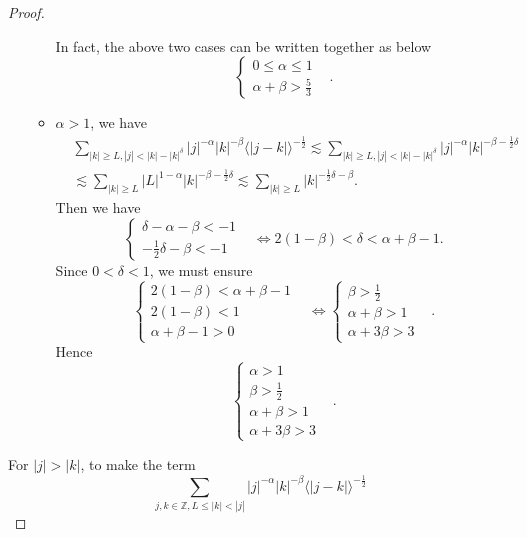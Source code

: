 \documentclass[12pt]{amsart}
\theoremstyle{definition}
\numberwithin{equation}{section}
\begin{document}
\begin{proof}
\begin{enumerate}
\begin{itemize}
     In fact, the above two cases can be written together as below 
     \begin{equation}
       \begin{cases}
          0\le \alpha\le 1&\\ 
          \alpha+\beta>\frac{5}{3}& 
       \end{cases}.       \label{case1}
     \end{equation}
       \item $\alpha>1$, we have  
    \begin{align*}
          & \sum_{|k|\ge L,|j|<|k|-|k|^\delta}|j|^{-\alpha}|k|^{-\beta}\langle |j-k|\rangle^{-\frac{1}{2}}\lesssim \sum_{|k|\ge L,|j|<|k|-|k|^{\delta}}|j|^{-\alpha}|k|^{-\beta-\frac{1}{2}\delta}\\
          &\lesssim \sum_{|k|\ge L }|L|^{1-\alpha}|k|^{-\beta-\frac{1}{2}\delta}\lesssim\sum_{|k|\ge L}|k|^{-\frac{1}{2}\delta-\beta}.
    \end{align*} 
    Then we have 
    $$
       \begin{cases}
          \delta-\alpha-\beta<-1 &\\
          -\frac{1}{2}\delta-\beta<-1 &
       \end{cases}\Leftrightarrow 2(1-\beta)<\delta<\alpha+\beta-1.
    $$
 Since $0<\delta<1$, we must ensure
 $$
    \begin{cases}
       2(1-\beta)<\alpha+\beta-1 &\\
       2(1-\beta)<1 &\\
       \alpha+\beta-1 >0
    \end{cases}\Leftrightarrow\begin{cases}
       \beta>\frac{1}{2}&\\
       \alpha+\beta>1 &\\
       \alpha+3\beta>3&
    \end{cases}.
 $$
  Hence
    \begin{equation}
       \begin{cases}
          \alpha>1 &\\
          \beta> \frac{1}{2}&\\
          \alpha+\beta>1 &\\
          \alpha+3\beta>3 
       \end{cases}.\label{case2}
    \end{equation}   
    \end{itemize}
    \end{enumerate}
    For $|j|>|k|$, to make the term 
    $$
       \sum_{j,k\in \mathbb{Z}, L\le |k|<|j|}|j|^{-\alpha}|k|^{-\beta}\langle|j-k|\rangle^{-\frac{1}{2}}
$$
\end{proof}
\end{document}
